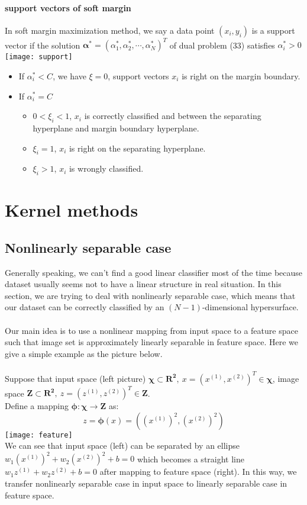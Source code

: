 \paragraph{support vectors of soft margin} In soft margin maximization method, we say a data point $(x_{i},y_{i})$ is a support vector if the solution $\bm\alpha^*=(\alpha_{1}^*,\alpha_{2}^*,\cdots,\alpha_{N}^*)^T$ of dual problem (33) satisfies $\alpha_{i}^*>0$\\
\texttt{[image: support]}
\begin{itemize}
  \item If $\alpha_{i}^*<C$, we have $\xi=0$, support vectors $x_{i}$ is right on the margin boundary.
  \item If $\alpha_{i}^*=C$
        \begin{itemize}
          \item $0<\xi_{i}<1$, $x_{i}$ is correctly classified and between the separating hyperplane and margin boundary hyperplane.
          \item $\xi_{i}=1$, $x_{i}$ is right on the separating hyperplane.
          \item $\xi_{i}>1$, $x_{i}$ is wrongly classified.
        \end{itemize}
\end{itemize}

\section{Kernel methods}

\subsection{Nonlinearly separable case}
Generally speaking, we can't find a good linear classifier most of the time because dataset usually seems not to have a linear structure in real situation. In this section, we are trying to deal with nonlinearly separable case, which means that our dataset can be correctly classified by an $(N-1)$-dimensional hypersurface.\\
\\
Our main idea is to use a nonlinear mapping from input space to a feature space such that image set is approximately linearly separable in feature space. Here we give a simple example as the picture below.\\
\\
Suppose that input space (left picture) $\bm\chi\subset \mathbf{R^2},\ x=(x^{(1)},x^{(2)})^T\in \bm\chi$, image space $\bm Z\subset \mathbf{R^2},\ z=(z^{(1)},z^{(2)})^T\in \bm Z$.\\
Define a mapping $\bm\phi:\bm\chi\rightarrow\bm Z$ as:$$z=\bm\phi(x)=((x^{(1)})^2,(x^{(2)})^2)$$
\texttt{[image: feature]}\\
We can see that input space (left) can be separated by an ellipse $w_{1}(x^{(1)})^2+w_{2}(x^{(2)})^2+b=0$ which becomes a straight line $w_{1}z^{(1)}+w_{2}z^{(2)}+b=0$ after mapping to feature space (right). In this way, we transfer nonlinearly separable case in input space to linearly separable case in feature space.

